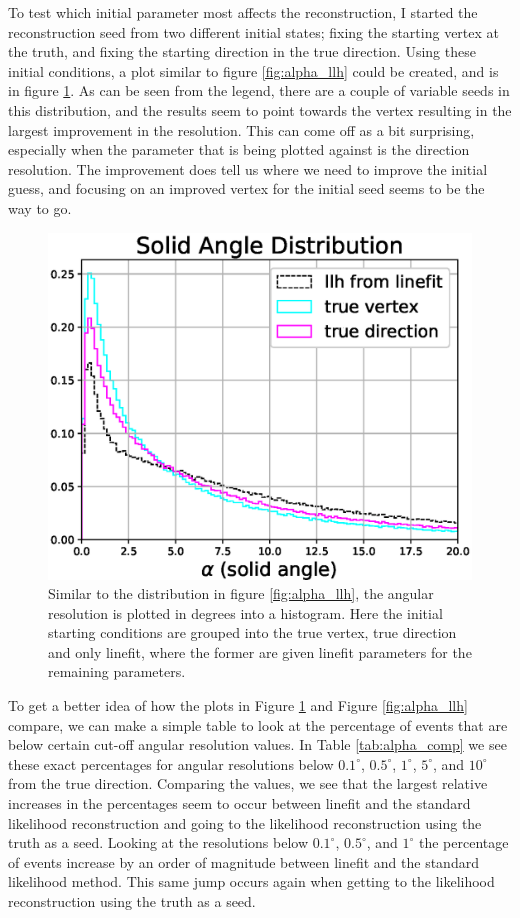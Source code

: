 To test which initial parameter most affects the reconstruction, I started the reconstruction seed from two different initial states; fixing the starting vertex at the truth, and fixing the starting direction in the true direction. Using these initial conditions, a plot similar to figure \ref{fig:alpha_llh} could be created, and is in figure \ref{fig:alpha_llh_test}. As can be seen from the legend, there are a couple of variable seeds in this distribution, and the results seem to point towards the vertex resulting in the largest improvement in the resolution. This can come off as a bit surprising, especially when the parameter that is being plotted against is the direction resolution. The improvement does tell us where we need to improve the initial guess, and focusing on an improved vertex for the initial seed seems to be the way to go.

\begin{figure}[H]
  \centering
  \includegraphics[width=12cm]{./Figures/reco_plots/alpha_dist_llh_seedcomparison.eps}
  \caption{Similar to the distribution in figure \ref{fig:alpha_llh}, the angular resolution is plotted in degrees into a histogram. Here the initial starting conditions are grouped into the true vertex, true direction and only linefit, where the former are given linefit parameters for the remaining parameters.}
  \label{fig:alpha_llh_test}
\end{figure}

To get a better idea of how the plots in Figure \ref{fig:alpha_llh_test} and Figure \ref{fig:alpha_llh} compare, we can make a simple table to look at the percentage of events that are below certain cut-off angular resolution values. In Table \ref{tab:alpha_comp} we see these exact percentages for angular resolutions below $0.1^{\circ}$, $0.5^{\circ}$, $1^{\circ}$, $5^{\circ}$, and $10^{\circ}$ from the true direction. Comparing the values, we see that the largest relative increases in the percentages seem to occur between linefit and the standard likelihood reconstruction and going to the likelihood reconstruction using the truth as a seed. Looking at the resolutions below $0.1^{\circ}$, $0.5^{\circ}$, and $1^{\circ}$ the percentage of events increase by an order of magnitude between linefit and the standard likelihood method. This same jump occurs again when getting to the likelihood reconstruction using the truth as a seed. 

